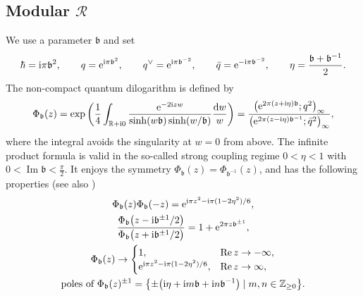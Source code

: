\documentclass[pdftex]{sigma}
\newcommand{\Z}{{\mathbb Z}}
\newcommand{\R}{{\mathbb R}}
\newcommand{\bb}{{\mathfrak b}}
\newcommand{\e}{{\mathrm e}}
\numberwithin{equation}{section}
\begin{document}
\subsection[Modular R]{Modular $\boldsymbol{\mathcal{R}}$}
We use a parameter $\bb$ and set
\begin{align}\label{qq}
\hbar = {\rm i}\pi \bb^2,\qquad q= \e^{ {\rm i} \pi \bb^2},
\qquad q^\vee = \e^{ {\rm i} \pi \bb^{-2}},\qquad \bar{q} = \e^{- {\rm i} \pi \bb^{-2}},
\qquad \eta = \frac{\bb+\bb^{-1}}{2}.
\end{align}
The non-compact quantum dilogarithm is defined by
\begin{align}\label{ncq}
\Phi_\bb(z) = \exp\left(
\frac{1}{4}\int_{\R+{\rm i} 0} \frac{\e^{-2{\rm i}zw}}{\sinh(w \bb)\sinh(w/\bb)}\frac{{\rm d}w}{w}\right)
= \frac{\bigl(\e^{2\pi(z+{\rm i}\eta)\bb};q^2\bigr)_\infty}{\bigl(\e^{2\pi(z-{\rm i}\eta)\bb^{-1}};\bar{q}^2\bigr)_\infty},
\end{align}
where the integral avoids the singularity at $w=0$ from above.
The infinite product formula is valid in the so-called strong coupling regime $0<\eta < 1$
with $0<\operatorname{Im}\bb <\frac{\pi}{2}$.
It enjoys the symmetry
$\Phi_\bb(z) = \Phi_{\bb^{-1}}(z)$, and
has the following properties (see also \cite{FKV01})
\begin{gather}
\Phi_\bb(z)\Phi_\bb(-z) = \e^{ {\rm i} \pi z^2- {\rm i} \pi (1-2\eta^2)/6},
\label{pinv}\\
\frac{\Phi_\bb\bigl(z-{\rm i} \bb^{\pm 1}/2\bigr)}{\Phi_\bb\bigl(z+{\rm i} \bb^{\pm 1}/2\bigr)}
= 1+\e^{2\pi z \bb^{\pm1}},
\label{prec}
\\
\Phi_\bb(z) \rightarrow
\begin{cases} 1, & \operatorname{Re} z \rightarrow -\infty,
\\
\e^{ {\rm i} \pi z^2- {\rm i} \pi (1-2\eta^2)/6}, & \operatorname{Re} z \rightarrow \infty,
\end{cases}
\label{pa}
\\
\text{poles of $\Phi_\bb(z)^{\pm 1}$} = \bigl\{ \pm \bigl({\rm i}\eta + {\rm i} m \bb + {\rm i}n \bb^{-1}\bigr)\mid m,n \in \Z_{\ge 0}\bigr\}.
\label{pz}
\end{gather}
\end{document}
